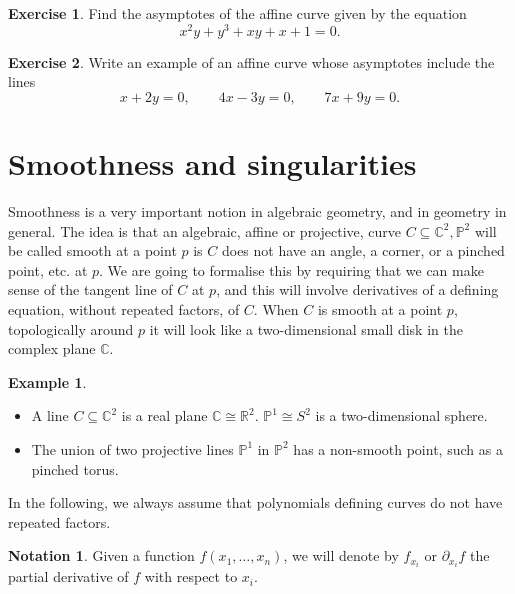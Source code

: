 \documentclass{article}
\newcommand{\R}{\mathbb{R}}
\newcommand{\C}{\mathbb{C}}
\renewcommand{\P}{\mathbb{P}}
\newcommand{\rb}[1]{\left( #1 \right)}
\theoremstyle{definition}\newtheorem{definition}{Definition}[section]
\theoremstyle{definition}\newtheorem{notation}[definition]{Notation}
\theoremstyle{definition}\newtheorem{remark}[definition]{Remark}
\theoremstyle{definition}\newtheorem{example1}[definition]{Example}
\theoremstyle{definition}\newtheorem{fact}{Fact}
\theoremstyle{definition}\newtheorem{exercise}{Exercise}
\theoremstyle{definition}\newtheorem*{example2}{Example}
\begin{document}
\begin{exercise}
Find the asymptotes of the affine curve given by the equation
$$ x^2y + y^3 + xy + x + 1 = 0. $$
\end{exercise}

\begin{exercise}
Write an example of an affine curve whose asymptotes include the lines
$$ x + 2y = 0, \qquad 4x - 3y = 0, \qquad 7x + 9y = 0. $$
\end{exercise}

\pagebreak


\section{Smoothness and singularities}

Smoothness is a very important notion in algebraic geometry, and in geometry in general. The idea is that an algebraic, affine or projective, curve $ C \subseteq \C^2, \P^2 $ will be called smooth at a point $ p $ is $ C $ does not have an angle, a corner, or a pinched point, etc. at $ p $. We are going to formalise this by requiring that we can make sense of the tangent line of $ C $ at $ p $, and this will involve derivatives of a defining equation, without repeated factors, of $ C $. When $ C $ is smooth at a point $ p $, topologically around $ p $ it will look like a two-dimensional small disk in the complex plane $ \C $.

\begin{example2}
\hfill
\begin{itemize}
\item A line $ C \subseteq \C^2 $ is a real plane $ \C \cong \R^2 $. $ \P^1 \cong S^2 $ is a two-dimensional sphere.
\item The union of two projective lines $ \P^1 $ in $ \P^2 $ has a non-smooth point, such as a pinched torus.
\end{itemize}
\end{example2}

In the following, we always assume that polynomials defining curves do not have repeated factors.

\begin{notation}
Given a function $ f\rb{x_1, \dots, x_n} $, we will denote by $ f_{x_i} $ or $ \partial_{x_i}f $ the partial derivative of $ f $ with respect to $ x_i $.
\end{notation}
\end{document}
